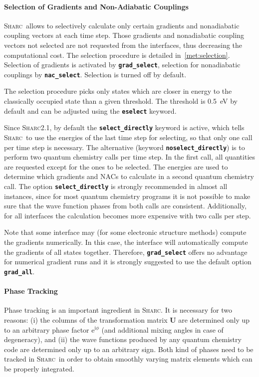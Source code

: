 \documentclass[a4paper,10pt,DIV=15,openany]{scrbook}
\newcommand{\sharc}{\textsc{Sharc}}
\newcommand{\ttt}[1]{\textbf{\texttt{#1}}}
\newcommand{\VEC}[1]{\ensuremath{\mathbf{#1}}}
\begin{document}
\paragraph{Selection of Gradients and Non-Adiabatic Couplings}

\sharc\ allows to selectively calculate only certain gradients and nonadiabatic coupling vectors at each time step. Those gradients and nonadiabatic coupling vectors not selected are not requested from the interfaces, thus decreasing the computational cost. The selection procedure is detailed in~\ref{met:selection}.
Selection of gradients is activated by \ttt{grad\_select}, selection for nonadiabatic couplings by \ttt{nac\_select}. Selection is turned off by default. 

The selection procedure picks only states which are closer in energy to the classically occupied state than a given threshold. The threshold is 0.5~eV by default and can be adjusted using the \ttt{eselect} keyword.

Since \sharc2.1, by default the \ttt{select\_directly} keyword is active, which tells \sharc\ to use the energies of the last time step for selecting, so that only one call per time step is necessary.
The alternative (keyword \ttt{noselect\_directly}) is to perform two quantum chemistry calls per time step. In the first call, all quantities are requested except for the ones to be selected. The energies are used to determine which gradients and NACs to calculate in a second quantum chemistry call.
The option \ttt{select\_directly} is strongly recommended in almost all instances, since for most quantum chemistry programs it is not possible to make sure that the wave function phases from both calls are consistent.
Additionally, for all interfaces the calculation becomes more expensive with two calls per step.

Note that some interface may (for some electronic structure methods) compute the gradients numerically.
In this case, the interface will automatically compute the gradients of all states together.
Therefore, \ttt{grad\_select} offers no advantage for numerical gradient runs and it is strongly suggested to use the default option \ttt{grad\_all}.

\paragraph{Phase Tracking}

Phase tracking is an important ingredient in \sharc. It is necessary for two reasons: (i) the columns of the transformation matrix $\VEC{U}$ are determined only up to an arbitrary phase factor $\mathrm{e}^{\mathrm{i}\phi}$ (and additional mixing angles in case of degeneracy), and (ii) the wave functions produced by any quantum chemistry code are determined only up to an arbitrary sign.
Both kind of phases need to be tracked in \sharc\ in order to obtain smoothly varying matrix elements which can be properly integrated.
\end{document}
